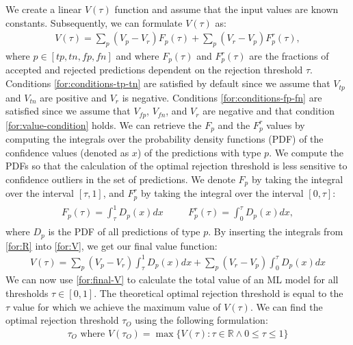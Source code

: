 %
We create a linear $V(\tau)$ function and assume that the input values are known constants.
%
Subsequently, we can formulate $V(\tau)$ as:
\begin{align}
    \label{for:V}
    V(\tau) = \sum_{p} (V_p - V_r)F_p(\tau) + \sum_{p} (V_r - V_p)F^r_{p}(\tau),
\end{align}
%
where $p \in [tp, tn, fp, fn]$ and where $F_p(\tau)$ and $F_p^r(\tau)$ are the fractions of accepted and rejected predictions dependent on the rejection threshold $\tau$.
%
Conditions \ref{for:conditions-tp-tn} are satisfied by default since we assume that $V_{tp}$ and $V_{tn}$ are positive and $V_r$ is negative.
%
Conditions \ref{for:conditions-fp-fn} are satisfied since we assume that $V_{fp}$, $V_{fn}$, and $V_r$ are negative and that condition \ref{for:value-condition} holds.
% 
We can retrieve the $F_p$ and the $F_p^r$ values by computing the integrals over the probability density functions (PDF) of the confidence values (denoted as $x$) of the predictions with type $p$.
%
We compute the PDFs so that the calculation of the optimal rejection threshold is less sensitive to confidence outliers in the set of predictions.
%
We denote $F_p$ by taking the integral over the interval $[\tau, 1]$, and $F_p^r$ by taking the integral over the interval $[0, \tau]$:
%
\begin{align}
    \label{for:R}
    \begin{aligned}
        F_{p}(\tau) = \int_\tau^1 D_p(x)dx & \quad & F_p^r(\tau) = \int_0^\tau D_p(x)dx,
    \end{aligned}
\end{align}
%
where $D_p$ is the PDF of all predictions of type $p$.
%
By inserting the integrals from \ref{for:R} into \ref{for:V}, we get our final value function:
%
\begin{align}
    \label{for:final-V}
    V(\tau) = \sum_p (V_p - V_r)\int_\tau^1 D_p(x)dx + \sum_p (V_r - V_p)\int_0^\tau D_p(x)dx
\end{align}
%
We can now use \ref{for:final-V} to calculate the total value of an  ML model for all thresholds $\tau \in [0, 1]$.
%
The theoretical optimal rejection threshold is equal to the $\tau$ value for which we achieve the maximum value of $V(\tau)$.
%
We can find the optimal rejection threshold $\tau_O$ using the following formulation:
%
\begin{align}
    \label{for:optimal-threshold}
    \tau_O \text{ where } V(\tau_O) = \max \{V(\tau): \tau \in \mathbb{R} \wedge 0 \leq \tau \leq 1 \}
\end{align}

